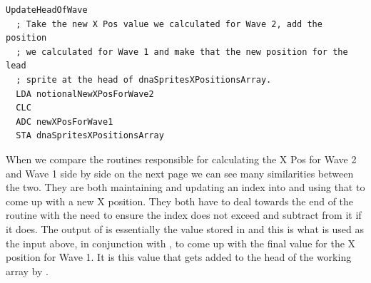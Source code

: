 \begin{lstlisting}[caption=From \icode{CalculateValueOfNewXPosForWave1}]
UpdateHeadOfWave   
  ; Take the new X Pos value we calculated for Wave 2, add the position
  ; we calculated for Wave 1 and make that the new position for the lead
  ; sprite at the head of dnaSpritesXPositionsArray.
  LDA notionalNewXPosForWave2
  CLC
  ADC newXPosForWave1
  STA dnaSpritesXPositionsArray
\end{lstlisting}

When we compare the routines responsible for calculating the X Pos for Wave 2 and Wave 1 side by side on the next
page we can see many similarities between the two. They are both maintaining and updating an index into 
 and using that to come up with a new X position. They both have to deal towards the end
of the routine with the need to ensure the index does not exceed  and subtract  from it if
it does. The output of  is essentially the value stored in 
and this is what is used as the input above, in conjunction with , to come up with the final
value for the X position for Wave 1. It is this value that gets added to the head of the working array 
by .

